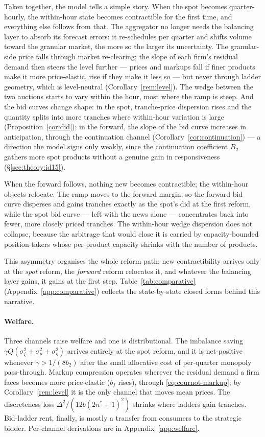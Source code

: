 \documentclass[11pt,a4paper]{article}
\theoremstyle{definition}
\theoremstyle{remark}
\theoremstyle{plain}
\begin{document}
Taken together, the model tells a simple story. When the spot becomes quarter-hourly, the within-hour state becomes contractible for the first time, and everything else follows from that. The aggregator no longer needs the balancing layer to absorb its forecast errors: it re-schedules per quarter and shifts volume toward the granular market, the more so the larger its uncertainty. The granular-side price falls through market re-clearing; the slope of each firm's residual demand then steers the level further --- prices and markups fall if finer products make it more price-elastic, rise if they make it less so --- but never through ladder geometry, which is level-neutral (Corollary~\ref{rem:level}). The wedge between the two auctions starts to vary within the hour, most where the ramp is steep. And the bid curves change shape: in the spot, tranche-price dispersion rises and the quantity splits into more tranches where within-hour variation is large (Proposition~\ref{cor:did}); in the forward, the slope of the bid curve increases in anticipation, through the continuation channel (Corollary~\ref{cor:continuation}) --- a direction the model signs only weakly, since the continuation coefficient $B_2$ gathers more spot products without a genuine gain in responsiveness (\S\ref{sec:theory:id15}).

When the forward follows, nothing new becomes contractible; the within-hour objects relocate. The ramp moves to the forward margin, so the forward bid curve disperses and gains tranches exactly as the spot's did at the first reform, while the spot bid curve --- left with the news alone --- concentrates back into fewer, more closely priced tranches. The within-hour wedge dispersion does not collapse, because the arbitrage that would close it is carried by capacity-bounded position-takers whose per-product capacity shrinks with the number of products.

This asymmetry organises the whole reform path: new contractibility arrives only at the \emph{spot} reform, the \emph{forward} reform relocates it, and whatever the balancing layer gains, it gains at the first step. Table~\ref{tab:comparative} (Appendix~\ref{app:comparative}) collects the state-by-state closed forms behind this narrative.

\label{sec:theory:welfare}
\paragraph{Welfare.} Three channels raise welfare and one is distributional. The imbalance saving $\gamma Q(\sigma_\zeta^2+\sigma_\mu^2+\sigma_\eta^2)$ arrives entirely at the spot reform, and it is net-positive whenever $\gamma > 1/(8 b_2)$ after the small allocative cost of per-quarter monopoly pass-through. Markup compression operates wherever the residual demand a firm faces becomes more price-elastic ($b_f$ rises), through \eqref{eq:cournot-markup}; by Corollary~\ref{rem:level} it is the only channel that moves mean prices. The discreteness loss $\Delta^2/(12 b (2n^*+1)^2)$ shrinks where ladders gain tranches. Bid-ladder rent, finally, is mostly a transfer from consumers to the strategic bidder. Per-channel derivations are in Appendix~\ref{app:welfare}.
\end{document}
